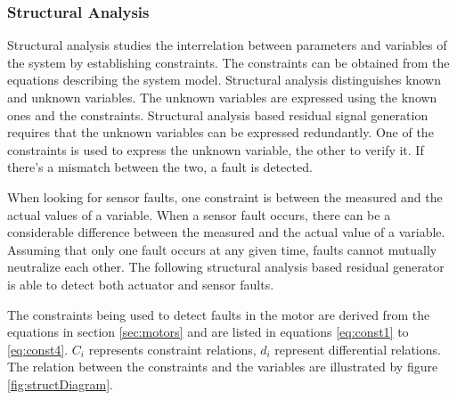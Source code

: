 \subsubsection{Structural Analysis}

\label{sec:structural}

Structural analysis studies the interrelation between parameters and variables of the system by establishing constraints. The constraints can be obtained from the equations describing the system model. Structural analysis distinguishes known and unknown variables. The unknown variables are expressed using the known ones and the constraints. Structural analysis based residual signal generation requires that the unknown variables can be expressed redundantly. One of the constraints is used to express the unknown variable, the other to verify it. If there's a mismatch between the two, a fault is detected.

When looking for sensor faults, one constraint is between the measured and the actual values of a variable. When a sensor fault occurs, there can be a considerable difference between the measured and the actual value of a variable. Assuming that only one fault occurs at any given time, faults cannot mutually neutralize each other. The following structural analysis based residual generator is able to detect both actuator and sensor faults.

The constraints being used to detect faults in the motor are derived from the equations in section \ref{sec:motors} and are listed in equations \ref{eq:const1} to \ref{eq:const4}. $C_i$ represents constraint relations, $d_i$ represent differential relations. The relation between the constraints and the variables are illustrated by figure \ref{fig:structDiagram}.



%

%

